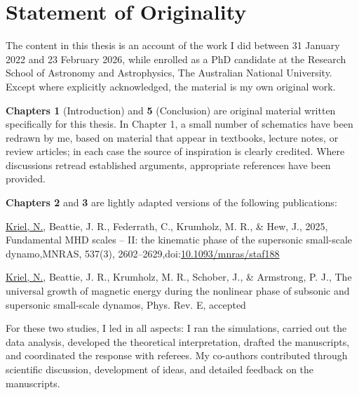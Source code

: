\chapter*{Statement of Originality}
\vspace{-0.5cm}

The content in this thesis is an account of the work I did between 31 January 2022 and 23 February 2026, while enrolled as a PhD candidate at the Research School of Astronomy and Astrophysics, The Australian National University. Except where explicitly acknowledged, the material is my own original work.

\textbf{Chapters 1} (Introduction) and \textbf{5} (Conclusion) are original material written specifically for this thesis. In Chapter 1, a small number of schematics have been redrawn by me, based on material that appear in textbooks, lecture notes, or review articles; in each case the source of inspiration is clearly credited. Where discussions retread established arguments, appropriate references have been provided.

\textbf{Chapters 2} and \textbf{3} are lightly adapted versions of the following publications:
\begin{description}
    \item \underline{{Kriel, N.}}, Beattie, J. R., Federrath, C., Krumholz, M. R., \& Hew, J., 2025, Fundamental MHD scales -- II: the kinematic phase of the supersonic small-scale dynamo,MNRAS, 537(3), 2602–2629,doi:\href{https://doi.org/10.1093/mnras/staf188}{10.1093/mnras/staf188}
    
    \item \underline{{Kriel, N.}}, Beattie, J. R., Krumholz, M. R., Schober, J., \& Armstrong, P. J., The universal growth of magnetic energy during the nonlinear phase of subsonic and supersonic small-scale dynamos, Phys. Rev. E, accepted
\end{description}
For these two studies, I led in all aspects: I ran the simulations, carried out the data analysis, developed the theoretical interpretation, drafted the manuscripts, and coordinated the response with referees. My co-authors contributed through scientific discussion, development of ideas, and detailed feedback on the manuscripts.


